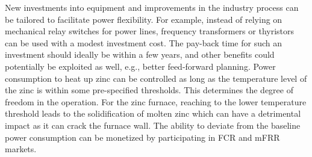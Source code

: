 \documentclass[conference]{IEEEtran}
\begin{document}

New investments into equipment and improvements in the industry process can be tailored to facilitate power flexibility. For example, instead of relying on mechanical relay switches for power lines, frequency transformers or thyristors can be used with a modest investment cost. The pay-back time for such an investment should ideally be within a few years, and other benefits could potentially be exploited as well, e.g., better feed-forward planning.
%
%
%
Power consumption to heat up zinc can be controlled as long as the temperature level of the zinc is within some pre-specified thresholds. This determines the degree of freedom in the operation. For the zinc furnace, reaching to the lower temperature threshold leads to the solidification of molten zinc which can have a detrimental impact as it can crack the furnace wall.
The ability to deviate from the baseline power consumption can be monetized by participating in FCR and mFRR markets. 


\end{document}
